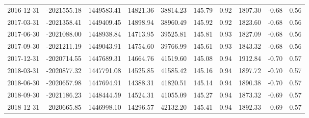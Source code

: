 \begin{landscape}
\begin{longtable}{llllllllll}
2016-12-31 & -2021555.18 & 1449583.41 & 14821.36 & 38814.23 & 145.79 & 0.92 & 1807.30 & -0.68 & 0.56 \\
2017-03-31 & -2021358.41 & 1449409.45 & 14898.94 & 38960.49 & 145.92 & 0.92 & 1823.60 & -0.68 & 0.56 \\
2017-06-30 & -2021088.00 & 1448938.84 & 14713.95 & 39525.81 & 145.81 & 0.93 & 1827.09 & -0.68 & 0.56 \\
2017-09-30 & -2021211.19 & 1449043.91 & 14754.60 & 39766.99 & 145.61 & 0.93 & 1843.32 & -0.68 & 0.56 \\
2017-12-31 & -2020714.55 & 1447689.31 & 14664.76 & 41519.60 & 145.08 & 0.94 & 1912.84 & -0.70 & 0.57 \\
2018-03-31 & -2020877.32 & 1447791.08 & 14525.85 & 41585.42 & 145.16 & 0.94 & 1897.72 & -0.70 & 0.57 \\
2018-06-30 & -2020657.98 & 1447694.91 & 14388.31 & 41820.51 & 145.14 & 0.94 & 1890.38 & -0.70 & 0.57 \\
2018-09-30 & -2021186.23 & 1448444.59 & 14524.31 & 41055.09 & 145.27 & 0.94 & 1873.32 & -0.69 & 0.57 \\
2018-12-31 & -2020665.85 & 1446998.10 & 14296.57 & 42132.20 & 145.41 & 0.94 & 1892.33 & -0.69 & 0.57
\end{longtable}
\end{landscape}

